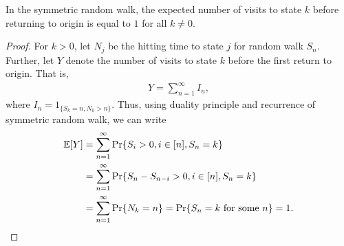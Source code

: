 \documentclass[a4paper,10pt,english]{article}
\begin{document}
\begin{prop}
In the symmetric random walk, the expected number of visits to state $k$ before returning to origin is equal to $1$ for all $k \neq 0$.
\end{prop}
\begin{proof}
For $k>0$, let $N_j$ be the hitting time to state $j$ for random walk $S_n$. 
Further, let $Y$ denote the number of visits to state $k$ before the first return to origin. That is, 
\begin{align*}Y = \sum_{n=1}^\infty I_n,\end{align*}
where $I_n = 1_{\{S_k = n, N_0 > n\}}$.
Thus, using duality principle and recurrence of symmetric random walk, we can write
\begin{align*}
\mathbb{E}[Y] &= \sum_{n=1}^\infty \Pr\{S_i > 0, i \in [n], S_n = k\}\\
&= \sum_{n=1}^\infty \Pr\{S_n - S_{n-i} > 0, i \in [n], S_n = k\}\\
&= \sum_{n=1}^\infty \Pr\{N_k = n\} = \Pr\{S_n = k \text{ for some }n\} = 1.
\end{align*}
\end{proof}
\end{document}
